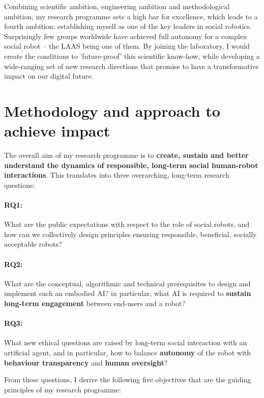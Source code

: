Combining scientific ambition, engineering ambition and methodological ambition,
my research programme sets a high bar for excellence, which leads to a fourth
ambition: establishing myself as one of the key leaders in social robotics.
Surprisingly few groups worldwide have achieved full autonomy for a complex
social robot -- the LAAS being one of them. By joining the laboratory, I would
create the conditions to 'future-proof' this scientific know-how, while
developing a wide-ranging set of new research directions that promise to have a
transformative impact on our digital future.

\vspace{3em}
\section{Methodology and approach to achieve impact}

The overall aim of my research programme is to \textbf{create, sustain and better
understand the dynamics of responsible, long-term social human-robot
interactions}. This translates into three overarching, long-term research questions:

\paragraph{\bf RQ1:} What are the public expectations with respect to the role
of social robots, and how can we collectively design principles ensuring
responsible, beneficial, socially acceptable robots?

\paragraph{\bf RQ2:} What are the conceptual, algorithmic and technical
prerequisites to design and implement such an embodied AI? in particular, what
AI is required to \textbf{sustain long-term engagement} between
end-users and a robot?

\paragraph{\bf RQ3:} What new ethical questions are raised by long-term social
interaction with an artificial agent, and in particular, how to balance
\textbf{autonomy} of the robot with \textbf{behaviour transparency} and
\textbf{human oversight}?

\vspace{0.5em}
\noindent From these questions, I derive the following five objectives that are
the guiding principles of my research programme:

